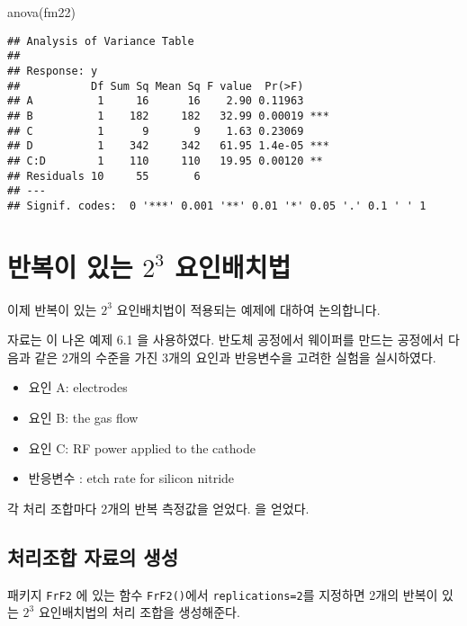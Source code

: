 \documentclass[
]{book}
\newenvironment{Shaded}{\begin{snugshade}}{\end{snugshade}}
\newcommand{\FunctionTok}[1]{\textcolor[rgb]{0.00,0.00,0.00}{#1}}
\newcommand{\NormalTok}[1]{#1}
\providecommand{\tightlist}{%
  \setlength{\itemsep}{0pt}\setlength{\parskip}{0pt}}
\begin{document}
\begin{Shaded}
\begin{Highlighting}[]
\FunctionTok{anova}\NormalTok{(fm22)}
\end{Highlighting}
\end{Shaded}

\begin{verbatim}
## Analysis of Variance Table
## 
## Response: y
##           Df Sum Sq Mean Sq F value  Pr(>F)    
## A          1     16      16    2.90 0.11963    
## B          1    182     182   32.99 0.00019 ***
## C          1      9       9    1.63 0.23069    
## D          1    342     342   61.95 1.4e-05 ***
## C:D        1    110     110   19.95 0.00120 ** 
## Residuals 10     55       6                    
## ---
## Signif. codes:  0 '***' 0.001 '**' 0.01 '*' 0.05 '.' 0.1 ' ' 1
\end{verbatim}

\hypertarget{threerep}{%
\chapter{\texorpdfstring{반복이 있는 \(2^3\) 요인배치법}{반복이 있는 2\^{}3 요인배치법}}\label{threerep}}

이제 반복이 있는 \(2^3\) 요인배치법이 적용되는 예제에 대하여 논의합니다.

자료는 \citep{montgomery2017design} 이 나온 예제 6.1 을 사용하였다. 반도체 공정에서 웨이퍼를 만드는 공정에서
다음과 같은 2개의 수준을 가진 3개의 요인과 반응변수을 고려한 실험을 실시하였다.

\begin{itemize}
\tightlist
\item
  요인 A: electrodes
\item
  요인 B: the gas flow
\item
  요인 C: RF power applied to the cathode
\item
  반응변수 : etch rate for silicon nitride
\end{itemize}

각 처리 조합마다 2개의 반복 측정값을 얻었다.
을 얻었다.

\hypertarget{uxcc98uxb9acuxc870uxd569-uxc790uxb8ccuxc758-uxc0dduxc131-2}{%
\section{처리조합 자료의 생성}\label{uxcc98uxb9acuxc870uxd569-uxc790uxb8ccuxc758-uxc0dduxc131-2}}

패키지 \texttt{FrF2} 에 있는 함수 \texttt{FrF2()}에서 \texttt{replications=2}를 지정하면 2개의 반복이 있는 \(2^3\) 요인배치법의 처리 조합을 생성해준다.
\end{document}

